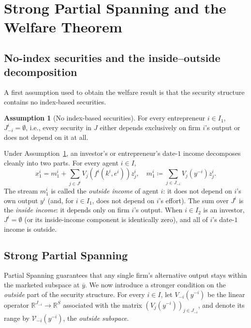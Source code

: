 \documentclass[11pt,a4paper,oneside]{book}
\def\R{\mathbb{R}}
\theoremstyle{plain}
\theoremstyle{definition}
\newtheorem{assumption}[theorem]{Assumption}
\theoremstyle{remark}
\numberwithin{equation}{chapter}
\begin{document}
\section{Strong Partial Spanning and the Welfare Theorem}
\label{sec:MH-welfare}

\subsection{No-index securities and the inside--outside decomposition}

A first assumption used to obtain the welfare result is that the security structure contains no index-based securities.

\begin{assumption}[No index-based securities]\label{ass:no-index}
For every entrepreneur $i \in I_1$, $J^i_{-i} = \emptyset$, i.e., every security in $J$ either depends exclusively on firm $i$'s output or does not depend on it at all.
\end{assumption}

Under Assumption~\ref{ass:no-index}, an investor's or entrepreneur's date-$1$ income decomposes cleanly into two parts.
For every agent $i \in I$,
\begin{equation}\label{eq:inside-outside}
  x^i_1 = m^i_1 + \sum_{j \in J^i} V_j(f^i(k^i, e^i)) z^i_j,
  \quad
  m^i_1 \coloneqq \sum_{j \in J_{-i}} V_j(y^{-i}) z^i_j.
\end{equation}
The stream $m^i_1$ is called the \emph{outside income} of agent $i$: it does not depend on $i$'s own output $y^i$ (and, for $i \in I_1$, does not depend on $i$'s effort).
The sum over $J^i$ is the \emph{inside income}: it depends only on firm $i$'s output.
When $i \in I_2$ is an investor, $J^i = \emptyset$ (or its inside-income component is identically zero), and all of $i$'s date-$1$ income is outside.

\subsection{Strong Partial Spanning}

Partial Spanning guarantees that any single firm's alternative output stays within the marketed subspace at $\overline{y}$.
We now introduce a stronger condition on the \emph{outside} part of the security structure.
For every $i \in I$, let $V_{-i}(y^{-i})$ be the linear operator $\R^{J_{-i}} \to \R^S$ associated with the matrix $(V_j(y^{-i}))_{j \in J_{-i}}$, and denote its range by $\mathcal{V}_{-i}(y^{-i})$, the \emph{outside subspace}.
\end{document}
